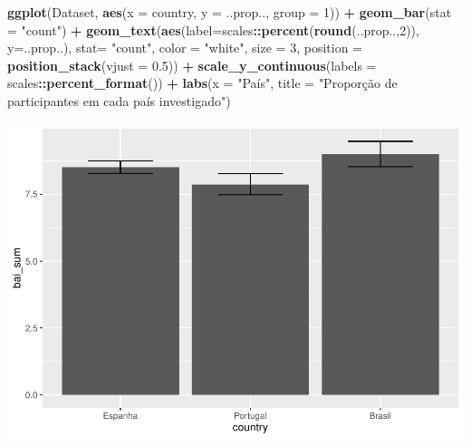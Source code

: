 \documentclass[
]{book}
\newenvironment{Shaded}{\begin{snugshade}}{\end{snugshade}}
\newcommand{\DataTypeTok}[1]{\textcolor[rgb]{0.13,0.29,0.53}{#1}}
\newcommand{\DecValTok}[1]{\textcolor[rgb]{0.00,0.00,0.81}{#1}}
\newcommand{\FloatTok}[1]{\textcolor[rgb]{0.00,0.00,0.81}{#1}}
\newcommand{\KeywordTok}[1]{\textcolor[rgb]{0.13,0.29,0.53}{\textbf{#1}}}
\newcommand{\NormalTok}[1]{#1}
\newcommand{\OperatorTok}[1]{\textcolor[rgb]{0.81,0.36,0.00}{\textbf{#1}}}
\newcommand{\StringTok}[1]{\textcolor[rgb]{0.31,0.60,0.02}{#1}}
\begin{document}
\begin{Shaded}
\begin{Highlighting}[]
\KeywordTok{ggplot}\NormalTok{(Dataset, }\KeywordTok{aes}\NormalTok{(}\DataTypeTok{x =}\NormalTok{ country, }\DataTypeTok{y =}\NormalTok{ ..prop.., }\DataTypeTok{group =} \DecValTok{1}\NormalTok{)) }\OperatorTok{+}\StringTok{ }
\StringTok{  }\KeywordTok{geom_bar}\NormalTok{(}\DataTypeTok{stat =} \StringTok{"count"}\NormalTok{) }\OperatorTok{+}
\StringTok{  }\KeywordTok{geom_text}\NormalTok{(}\KeywordTok{aes}\NormalTok{(}\DataTypeTok{label=}\NormalTok{scales}\OperatorTok{::}\KeywordTok{percent}\NormalTok{(}\KeywordTok{round}\NormalTok{(..prop..,}\DecValTok{2}\NormalTok{)), }
                \DataTypeTok{y=}\NormalTok{..prop..), }\DataTypeTok{stat=} \StringTok{"count"}\NormalTok{, }\DataTypeTok{color =} \StringTok{"white"}\NormalTok{, }\DataTypeTok{size =} \DecValTok{3}\NormalTok{, }\DataTypeTok{position =} \KeywordTok{position_stack}\NormalTok{(}\DataTypeTok{vjust =} \FloatTok{0.5}\NormalTok{)) }\OperatorTok{+}
\StringTok{  }\KeywordTok{scale_y_continuous}\NormalTok{(}\DataTypeTok{labels =}\NormalTok{ scales}\OperatorTok{::}\KeywordTok{percent_format}\NormalTok{()) }\OperatorTok{+}
\StringTok{  }\KeywordTok{labs}\NormalTok{(}\DataTypeTok{x =} \StringTok{"País"}\NormalTok{, }\DataTypeTok{title =} \StringTok{"Proporção de participantes em cada país investigado"}\NormalTok{)}
\end{Highlighting}
\end{Shaded}

\begin{center}\includegraphics{gitbook-demo_files/figure-latex/unnamed-chunk-20-1} \end{center}
\end{document}

